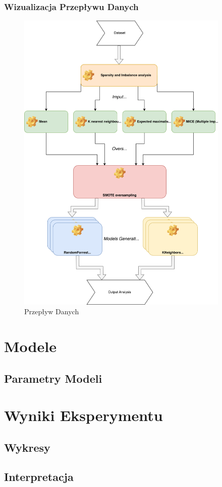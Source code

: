 \documentclass[11pt]{article}
\begin{document}
\subsubsection{Wizualizacja Przepływu Danych}
\begin{figure}[h]
	\caption{Przepływ Danych}
	\begin{center}
		\includegraphics[width=4in]{Dataflow}
	\end{center}
\end{figure}
\section{Modele}
\subsection{Parametry Modeli}
\section{Wyniki Eksperymentu}    
\subsection{Wykresy}
\subsection{Interpretacja}
\end{document}
